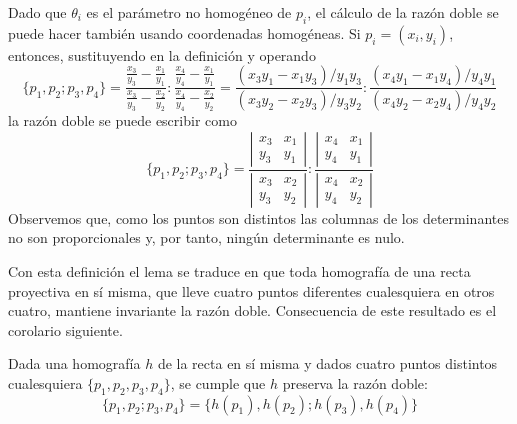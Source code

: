 \begin{obs}
	Dado que $\theta_i$ es el parámetro no homogéneo de $p_i$, el cálculo de la razón doble se puede hacer también usando coordenadas homogéneas. Si $p_i=(x_i,y_i)$, entonces, sustituyendo en la definición y operando
	\begin{equation*}
		\{p_1,p_2;p_3,p_4\}=\frac{\frac{x_3}{y_3}-\frac{x_1}{y_1}}{\frac{x_3}{y_3}-\frac{x_2}{y_2}}:\frac{\frac{x_4}{y_4}-\frac{x_1}{y_1}}{\frac{x_4}{y_4}-\frac{x_2}{y_2}}=\frac{(x_3y_1-x_1y_3)/y_1y_3}{(x_3y_2-x_2y_3)/y_3y_2}:\frac{(x_4y_1-x_1y_4)/y_4y_1}{(x_4y_2-x_2y_4)/y_4y_2}
	\end{equation*}
	la razón doble se puede escribir como
	\begin{equation}
	\{p_1,p_2;p_3,p_4\}=\frac{
		\left| \begin{array}{cc}
				x_3&x_1\\
				y_3&y_1
		\end{array}\right|}{
		\left| \begin{array}{cc}
		x_3&x_2\\
		y_3&y_2
		\end{array}\right|}:\frac{
		\left| \begin{array}{cc}
		x_4&x_1\\
		y_4&y_1
		\end{array}\right|}{
		\left| \begin{array}{cc}
		x_4&x_2\\
		y_4&y_2
		\end{array}\right|}
	\end{equation}
	Observemos que, como los puntos son distintos las columnas de los determinantes no son proporcionales y, por tanto, ningún determinante es nulo.
\end{obs}
Con esta definición el lema se traduce en que toda homografía de una recta proyectiva en sí misma, que lleve cuatro puntos diferentes cualesquiera en otros cuatro, mantiene invariante la razón doble. Consecuencia de este resultado es el corolario siguiente.
\begin{cor}
	Dada una homografía $h$ de la recta en sí misma y dados cuatro puntos distintos cualesquiera $\{p_1,p_2,p_3,p_4\}$, se cumple que $h$ preserva la razón doble:
	\begin{equation}
	\{p_1,p_2;p_3,p_4\}=\{h(p_1),h(p_2);h(p_3),h(p_4)\}
	\end{equation} 
\end{cor}
